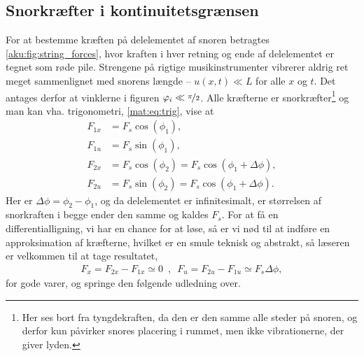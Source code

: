 \subsection{Snorkræfter i kontinuitetsgrænsen}
For at bestemme kræften på delelementet af snoren betragtes \cref{aku:fig:string_forces}, hvor kraften i hver retning og ende af delelementet er tegnet som røde pile. Strengene på rigtige musikinstrumenter vibrerer aldrig ret meget sammenlignet med snorens længde -- $u(x,t) \ll L$ for alle $x$ og $t$. Det antages derfor at vinklerne i figuren $\phi_i \ll \nicefrac{\pi}{2}$. Alle kræfterne er snorkræfter\footnote{Her ses bort fra tyngdekraften, da den er den samme alle steder på snoren, og derfor kun påvirker snores placering i rummet, men ikke vibrationerne, der giver lyden.} og man kan vha. trigonometri, \cref{mat:eq:trig}, vise at
%
\begin{subequations} \label{aku:eq:string_force}
\begin{align}
    F_{1x} &= F_s\cos(\phi_1), \\
    F_{1u} &= F_s\sin(\phi_1), \\
    F_{2x} &= F_s\cos(\phi_2) = F_s\cos(\phi_1+\Delta\phi), \\
    F_{2u} &= F_s\sin(\phi_2) = F_s\cos(\phi_1+\Delta\phi).
\end{align}
\end{subequations}
%
Her er $\Delta \phi = \phi_2 - \phi_1$, og da delelementet er infinitesimalt, er størrelsen af snorkraften i begge ender den samme og kaldes $F_s$. For at få en differentialligning, vi har en chance for at løse, så er vi nød til at indføre en approksimation af kræfterne, hvilket er en smule teknisk og abstrakt, så læseren er velkommen til at tage resultatet,
%
\begin{align}
    F_x = F_{2x} - F_{1x} \simeq 0 \enspace , \enspace F_u = F_{2u} - F_{1u} \simeq F_s\Delta\phi,
\end{align}
%
for gode varer, og springe den følgende udledning over. \\

